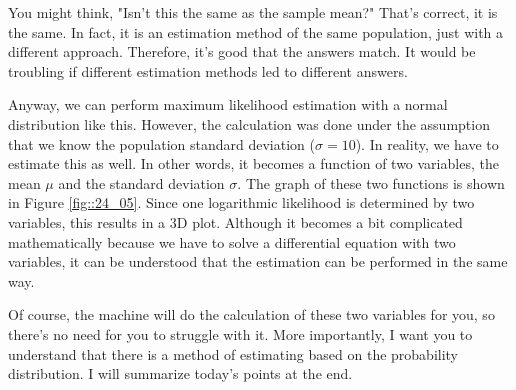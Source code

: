 \documentclass{ltjsbook}
\begin{document}
You might think, "Isn't this the same as the sample mean?" That's correct, it is the same. In fact, it is an estimation method of the same population, just with a different approach. Therefore, it's good that the answers match. It would be troubling if different estimation methods led to different answers.

Anyway, we can perform maximum likelihood estimation with a normal distribution like this. However, the calculation was done under the assumption that we know the population standard deviation ($\sigma=10$). In reality, we have to estimate this as well. In other words, it becomes a function of two variables, the mean $\mu$ and the standard deviation $\sigma$. The graph of these two functions is shown in Figure \ref{fig::24_05}. Since one logarithmic likelihood is determined by two variables, this results in a 3D plot. Although it becomes a bit complicated mathematically because we have to solve a differential equation with two variables, it can be understood that the estimation can be performed in the same way.


Of course, the machine will do the calculation of these two variables for you, so there's no need for you to struggle with it. More importantly, I want you to understand that there is a method of estimating based on the probability distribution.
I will summarize today's points at the end.
\end{document}
